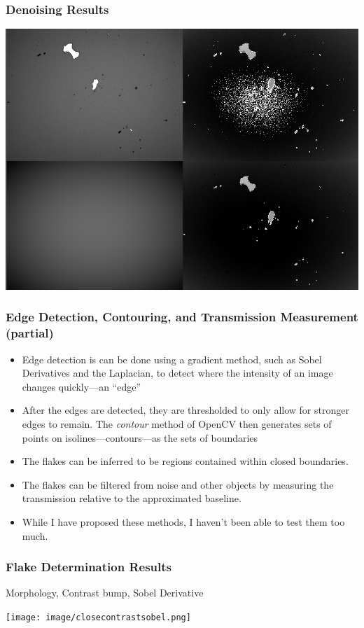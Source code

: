 \documentclass{beamer}
\begin{document}
\begin{frame}
	\frametitle{Denoising Results}
	\begin{center}
		\includegraphics[scale = 0.3]{image/morph2.png}
	\end{center}
\end{frame}

\begin{frame}
	\frametitle{Edge Detection, Contouring, and Transmission Measurement (partial)}
	\begin{itemize}
		\item<1-> Edge detection is can be done using a gradient method, such as Sobel Derivatives and the Laplacian, to detect where the intensity of an image changes quickly---an ``edge''
		\item<2-> After the edges are detected, they are thresholded to only allow for stronger edges to remain. The \emph{contour} method of OpenCV then generates sets of points on isolines---contours---as the sets of boundaries
		\item<3-> The flakes can be inferred to be regions contained within closed boundaries.
		\item<4-> The flakes can be filtered from noise and other objects by measuring the transmission relative to the approximated baseline.
		\item<5-> While I have proposed these methods, I haven't been able to test them too much.
	\end{itemize}
\end{frame}

\begin{frame}
	\frametitle{Flake Determination Results}
	Morphology, Contrast bump, Sobel Derivative
	\begin{center}
		\texttt{[image: image/closecontrastsobel.png]}
	\end{center}
\end{frame}
\end{document}

